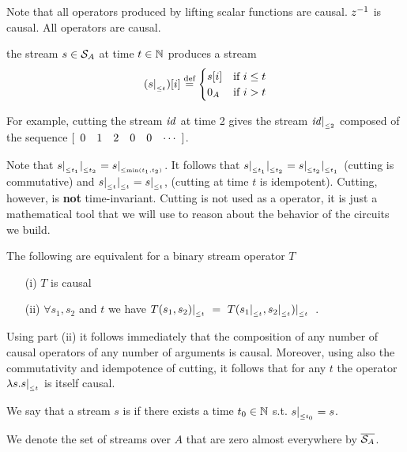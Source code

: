 Note that all operators produced by lifting scalar functions are causal. 
$z^{-1}$ is causal.  All \dbsp operators are causal.

\begin{definition}[Cutting]
 the stream $s \in \mathcal{S}_{A}$ at time $t \in \mathbb{N}$ produces a stream
$$
(s|_{_{\leq t}})[i] \stackrel{\textrm{\scriptsize def}}{=}  \begin{cases}
                      s[i] &\text{if}~i\leq t\\
                      0_A  &\text{if}~i>t
                      \end{cases}
$$
\end{definition}
For example, cutting the stream $\mathit{id}$ at time 2 gives the stream $\mathit{id}|_{_{\leq 2}}$
composed of the sequence $\sv{0 1 2 0 0}$.

Note that $s|_{_{\leq t_1}}|_{_{\leq t_2}}=s|_{_{\leq \min(t_1,t_2)}}$. It follows that
$s|_{_{\leq t_1}}|_{_{\leq t_2}}=s|_{_{\leq t_2}}|_{_{\leq t_1}}$ (cutting is commutative) and
$s|_{_{\leq t}}|_{_{\leq t}}=s|_{_{\leq t}}$, (cutting at time $t$ is idempotent).
Cutting, however, is \textbf{not} time-invariant.  Cutting is not 
used as a \dbsp operator, it is just a mathematical tool that we will use to 
reason about the behavior of the circuits we build.

\begin{lemma}
\label{lemma-causal-characterization}
The following are equivalent for a binary stream operator $T$
\begin{enumerate}
\item[(i)] $T$ is causal
\item[(ii)] $\forall s_1,s_2$ and $t$  we have $T(s_1,s_2)|_{_{\leq t}} ~=~ T(s_1|_{_{\leq t}},s_2|_{_{\leq t}})|_{_{\leq t}}$~.
\end{enumerate}
\end{lemma}
Using part (ii) it follows immediately that the composition
of any number of causal operators of any number of arguments is causal.
Moreover, using also the commutativity and idempotence of cutting, it follows that
for any $t$ the operator $\lambda s.s|_{_{\leq t}}$ is itself causal.

\begin{definition}\label{def:zae}
We say that a stream $s$ is  if there exists a time $t_0 \in \mathbb{N}$
s.t. $s|_{_{\leq t_0}} = s$.
\end{definition}

We denote the set of streams over $A$ that are zero almost everywhere
by $\overline{\mathcal{S}_{A}}$.

